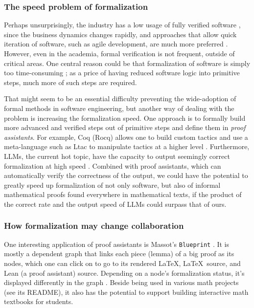 \documentclass[10pt]{article}
\begin{document}
\subsubsection{The speed problem of formalization}
Perhaps unsurprisingly, the industry has a low usage of fully verified software
\cite{formal.methods.underuse}, since the business dynamics changes rapidly,
and approaches that allow quick iteration of software, such as agile
development, are much more preferred \cite{agile.se}. However, even in the
academia, formal verification is not frequent, outside of critical areas. One
central reason could be that formalization of software is simply too
time-consuming \cite{formal.methods.underuse}; as a price of having reduced
software logic into primitive steps, much more of such steps are required.

That might seem to be an essential difficulty preventing the wide-adoption of
formal methods in software engineering, but another way of dealing with the
problem is increasing the formalization speed. One approach is to formally build
more advanced and verified steps out of primitive steps and define them in
\emph{proof assistants}. For example, Coq (Rocq) allows one to build custom
tactics and use a meta-language such as Ltac to manipulate tactics at a higher
level \cite{coq.manual}. Furthermore, LLMs, the current hot topic, have the
capacity to output seemingly correct formalization at high speed
\cite{llm.gen.proof}.  Combined with proof assistants, which can automatically
verify the correctness of the output, we could have the potential to greatly
speed up formalization of not only software, but also of informal mathematical
proofs found everywhere in mathematical texts, if the product of the correct
rate and the output speed of LLMs could surpass that of ours.

\subsubsection{How formalization may change collaboration}
One interesting application of proof assistants is Massot's \texttt{Blueprint}
\cite{massot.blueprint}. It is mostly a dependent graph that links each piece
(lemma) of a big proof as its nodes, which one can click on to go to its
rendered \LaTeX, \LaTeX\ source, and Lean (a proof assistant) source. Depending
on a node's formalization status, it's displayed differently in the graph
\cite{tao.blueprint.post}. Beside being used in various math projects (see its
README), it also has the potential to support building interactive math
textbooks for students.
\end{document}
